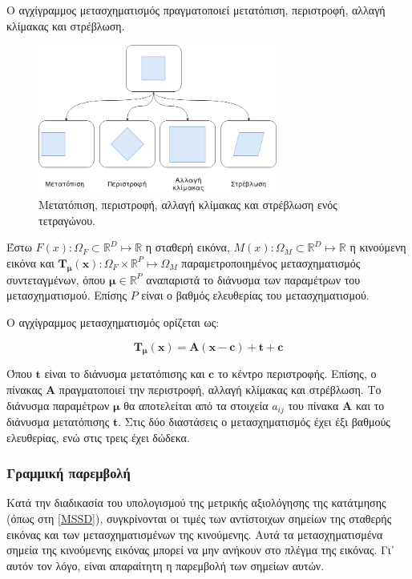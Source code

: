 \documentclass[a4paper,12pt]{article}
\newcommand{\R}{\mathbb{R}}
\begin{document}
Ο αγχίγραμμος μετασχηματισμός πραγματοποιεί μετατόπιση, περιστροφή, αλλαγή
κλίμακας και στρέβλωση.

\begin{figure}[H]
    \centering
    \includegraphics[width=0.7\textwidth]{affine_2}
    \captionsetup{width=0.7\textwidth}
    \caption{Μετατόπιση, περιστροφή, αλλαγή κλίμακας και στρέβλωση ενός
    τετραγώνου.}
\end{figure}

Έστω $F(x): \Omega_F \subset \R^D \mapsto \R$ η σταθερή εικόνα, $M(x): \Omega_M
\subset \R^D \mapsto \R$ η κινούμενη εικόνα και $\bm{T_{\mu}}(\bm{x}): \Omega_F
\times \R^P \mapsto \Omega_M$ παραμετροποιημένος μετασχηματισμός συντεταγμένων,
όπου $\bm{\mu} \in \R^P$ αναπαριστά το διάνυσμα των παραμέτρων του
μετασχηματισμού. Επίσης $P$ είναι ο βαθμός ελευθερίας του μετασχηματισμού.

Ο αγχίγραμμος μετασχηματισμός ορίζεται ως:

\begin{equation*}
    \bm{T_{\mu}}(\bm{x}) = \bm{A}(\bm{x} - \bm{c}) + \bm{t} + \bm{c}
\end{equation*}

Όπου $\bm{t}$ είναι το διάνυσμα μετατόπισης και $\bm{c}$ το κέντρο περιστροφής.
Επίσης, ο πίνακας $\bm{A}$ πραγματοποιεί την περιστροφή, αλλαγή κλίμακας και
στρέβλωση. Το διάνυσμα παραμέτρων $\bm{\mu}$ θα αποτελείται από τα στοιχεία
$a_{ij}$ του πίνακα $\bm{A}$ και το διάνυσμα μετατόπισης $\bm{t}$. Στις δύο
διαστάσεις ο μετασχηματισμός έχει έξι βαθμούς ελευθερίας, ενώ στις τρεις έχει
δώδεκα.

\subsubsection{Γραμμική παρεμβολή} \label{reg:linear:1}

Κατά την διαδικασία του υπολογισμού της μετρικής αξιολόγησης της κατάτμησης
(όπως στη \ref{MSSD}), συγκρίνονται οι τιμές των αντίστοιχων σημείων της
σταθερής εικόνας και των μετασχηματισμένων της κινούμενης. Αυτά τα
μετασχηματισμένα σημεία της κινούμενης εικόνας μπορεί να μην ανήκουν στο πλέγμα
της εικόνας. Γι᾽ αυτόν τον λόγο, είναι απαραίτητη η παρεμβολή των σημείων αυτών.
\end{document}
